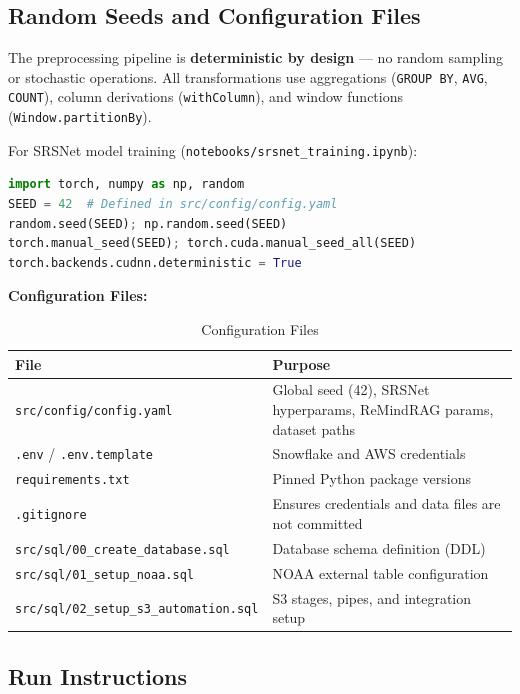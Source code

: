 \documentclass[14.5pt,letterpaper]{article}
\begin{document}
\subsection{Random Seeds and Configuration Files}

The preprocessing pipeline is \textbf{deterministic by design} --- no random sampling or stochastic operations. All transformations use aggregations (\texttt{GROUP BY}, \texttt{AVG}, \texttt{COUNT}), column derivations (\texttt{withColumn}), and window functions (\texttt{Window.partitionBy}).

For SRSNet model training (\texttt{notebooks/srsnet\_training.ipynb}):
\begin{lstlisting}[language=Python, caption={Random seed configuration}]
import torch, numpy as np, random
SEED = 42  # Defined in src/config/config.yaml
random.seed(SEED); np.random.seed(SEED)
torch.manual_seed(SEED); torch.cuda.manual_seed_all(SEED)
torch.backends.cudnn.deterministic = True
\end{lstlisting}

\textbf{Configuration Files:}
\begin{table}[H]
\centering
\caption{Configuration Files}
\begin{tabular}{@{}ll@{}}
\toprule
\textbf{File} & \textbf{Purpose} \\
\midrule
\texttt{src/config/config.yaml} & Global seed (42), SRSNet hyperparams, ReMindRAG params, dataset paths \\
\texttt{.env} / \texttt{.env.template} & Snowflake and AWS credentials \\
\texttt{requirements.txt} & Pinned Python package versions \\
\texttt{.gitignore} & Ensures credentials and data files are not committed \\
\texttt{src/sql/00\_create\_database.sql} & Database schema definition (DDL) \\
\texttt{src/sql/01\_setup\_noaa.sql} & NOAA external table configuration \\
\texttt{src/sql/02\_setup\_s3\_automation.sql} & S3 stages, pipes, and integration setup \\
\bottomrule
\end{tabular}
\end{table}

\subsection{Run Instructions}
\end{document}
